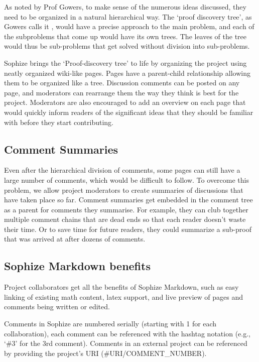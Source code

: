 \documentclass[a4paper]{article}
\begin{document}
As noted by Prof Gowers, to make sense of the numerous ideas discussed, they need to be organized in a natural hierarchical way. The `proof discovery tree', as Gowers calls it \cite{gowers_weblog_2009}, would have a precise approach to the main problem, and each of the subproblems that come up would have its own trees. The leaves of the tree would thus be sub-problems that get solved without division into sub-problems.


Sophize brings the `Proof-discovery tree' to life by organizing the project using neatly organized wiki-like pages. Pages have a parent-child relationship allowing them to be organized like a tree. Discussion comments can be posted on any page, and moderators can rearrange them the way they think is best for the project. Moderators are also encouraged to add an overview on each page that would quickly inform readers of the significant ideas that they should be familiar with before they start contributing.


\subsection{Comment Summaries}

Even after the hierarchical division of comments, some pages can still have a large number of comments, which would be difficult to follow. To overcome this problem, we allow project moderators to create summaries of discussions that have taken place so far. Comment summaries get embedded in the comment tree as a parent for comments they summarise. For example, they can club together multiple comment chains that are dead ends so that each reader doesn't waste their time. Or to save time for future readers, they could summarize a sub-proof that was arrived at after dozens of comments.


\subsection{Sophize Markdown benefits}

Project collaborators get all the benefits of Sophize Markdown, such as easy linking of existing math content, latex support, and live preview of pages and comments being written or edited.


Comments in Sophize are numbered serially (starting with 1 for each collaboration), each comment can be referenced with the hashtag notation (e.g., `\#3' for the 3rd comment). Comments in an external project can be referenced by providing the project's URI (\#URI/COMMENT\_NUMBER).
\end{document}
